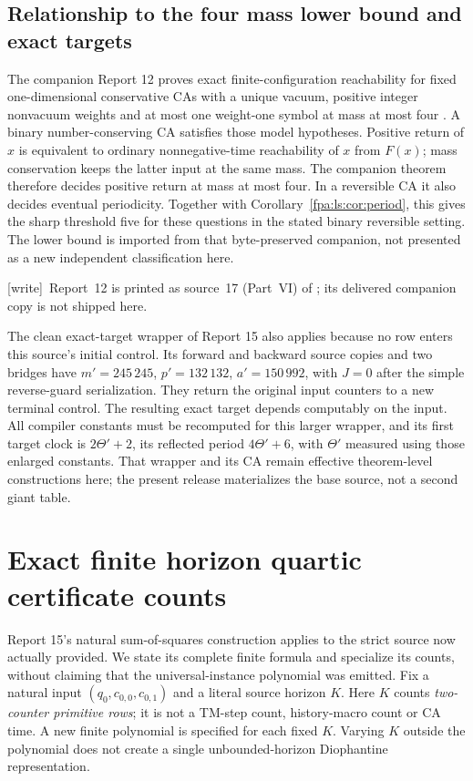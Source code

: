 \documentclass[11pt,a4paper]{article}
\numberwithin{equation}{section}
\newcommand{\wtag}{\textup{[write]}}
\begin{document}
\subsection{Relationship to the four mass lower bound and exact targets}
The companion Report 12 proves exact finite-configuration reachability
for fixed one-dimensional conservative CAs with a unique vacuum, positive
integer nonvacuum weights and at most one weight-one symbol at mass at most
four \cite{fpa:report12}. A binary number-conserving CA satisfies those model
hypotheses. Positive return of $x$ is equivalent to ordinary nonnegative-time
reachability of $x$ from $F(x)$; mass conservation keeps the latter input at
the same mass. The companion theorem therefore decides positive return at
mass at most four. In a reversible CA it also decides eventual periodicity.
Together with Corollary~\ref{fpa:ls:cor:period}, this gives the sharp threshold five
for these questions in the stated binary reversible setting. The lower
bound is imported from that byte-preserved companion, not presented as a
new independent classification here.

\wtag\ Report~12 is printed as source~17 (Part~VI) of ; its delivered companion copy is not shipped here.

The clean exact-target wrapper of Report 15 also applies because no row
enters this source's initial control. Its forward and backward source copies
and two bridges have $m'=245\,245$, $p'=132\,132$, $a'=150\,992$, with
$J=0$ after the simple reverse-guard serialization. They return the original
input counters to a new terminal control. The resulting exact target depends
computably on the input. All compiler constants must be recomputed for this
larger wrapper, and its first target clock is $2\Theta'+2$, its reflected
period $4\Theta'+6$, with $\Theta'$ measured using those enlarged constants.
That wrapper and its CA remain effective theorem-level constructions here;
the present release materializes the base source, not a second giant table.
\section{Exact finite horizon quartic certificate counts}\label{fpa:ls:sec:certificates}
Report 15's natural sum-of-squares construction applies to the strict source
now actually provided. We state its complete finite formula and specialize
its counts, without claiming that the universal-instance polynomial was
emitted. Fix a natural input $(q_0,c_{0,0},c_{0,1})$ and a literal source
horizon $K$. Here $K$ counts \emph{two-counter primitive rows}; it is not a
TM-step count, history-macro count or CA time. A new finite polynomial is
specified for each fixed $K$. Varying $K$ outside the polynomial does not
create a single unbounded-horizon Diophantine representation.
\end{document}
